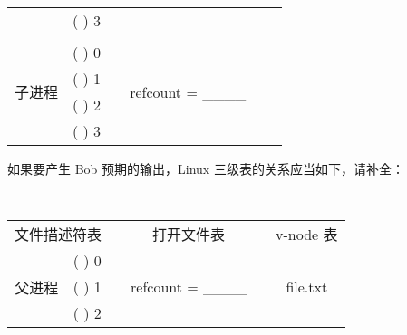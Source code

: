 \begin{problems}
\begin{table}[H]
\begin{tabular}{cccccc}
                \multicolumn{1}{|c|}{} & \multicolumn{1}{c|}{(     ) 3} & \multicolumn{1}{c|}{} & \multicolumn{1}{c|}{} & \multicolumn{1}{c|}{} & \multicolumn{1}{c|}{} \\ \cline{1-2} \cline{4-4}
                &  &  &  & \multicolumn{1}{c|}{} & \multicolumn{1}{c|}{} \\ \cline{1-2} \cline{4-4}
                \multicolumn{1}{|c|}{\multirow{4}{*}{子进程}} & \multicolumn{1}{c|}{(     ) 0} & \multicolumn{1}{c|}{} & \multicolumn{1}{c|}{\multirow{4}{*}{refcount = \_\_\_\_}} & \multicolumn{1}{c|}{} & \multicolumn{1}{c|}{} \\ \cline{2-2}
                \multicolumn{1}{|c|}{} & \multicolumn{1}{c|}{(     ) 1} & \multicolumn{1}{c|}{} & \multicolumn{1}{c|}{} & \multicolumn{1}{c|}{} & \multicolumn{1}{c|}{} \\ \cline{2-2}
                \multicolumn{1}{|c|}{} & \multicolumn{1}{c|}{(     ) 2} & \multicolumn{1}{c|}{} & \multicolumn{1}{c|}{} & \multicolumn{1}{c|}{} & \multicolumn{1}{c|}{} \\ \cline{2-2}
                \multicolumn{1}{|c|}{} & \multicolumn{1}{c|}{(     ) 3} & \multicolumn{1}{c|}{} & \multicolumn{1}{c|}{} & \multicolumn{1}{c|}{} & \multicolumn{1}{c|}{} \\ \cline{1-2} \cline{4-4} \cline{6-6} 
            \end{tabular}
        \end{table}
        \subqn 如果要产生 Bob 预期的输出，Linux 三级表的关系应当如下，请补全：
        \begin{table}[H]
            \tt
            \centering
            \begin{tabular}{cccccc}
                \multicolumn{2}{c}{文件描述符表} & {\qquad} & 打开文件表 & {\qquad} & v-node 表 \\ \cline{1-2} \cline{4-4} \cline{6-6} 
                \multicolumn{1}{|c|}{\multirow{4}{*}{父进程}} & \multicolumn{1}{c|}{(     ) 0} & \multicolumn{1}{c|}{} & \multicolumn{1}{c|}{\multirow{4}{*}{refcount = \_\_\_\_}} & \multicolumn{1}{c|}{} & \multicolumn{1}{c|}{\multirow{9}{*}{file.txt}} \\ \cline{2-2}
                \multicolumn{1}{|c|}{} & \multicolumn{1}{c|}{(     ) 1} & \multicolumn{1}{c|}{} & \multicolumn{1}{c|}{} & \multicolumn{1}{c|}{} & \multicolumn{1}{c|}{} \\ \cline{2-2}
                \multicolumn{1}{|c|}{} & \multicolumn{1}{c|}{(     ) 2} & \multicolumn{1}{c|}{} & \multicolumn{1}{c|}{} & \multicolumn{1}{c|}{} & \multicolumn{1}{c|}{} \\ \cline{2-2}

\end{tabular}
\end{table}
\end{problems}
